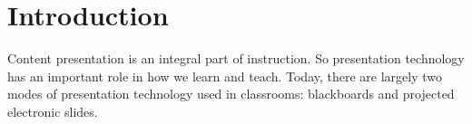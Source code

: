 \section{Introduction}

Content presentation is an integral part of instruction. So presentation technology has an important role in how we learn and teach. Today, there are largely two modes of presentation technology used in classrooms: blackboards and projected electronic slides. 
